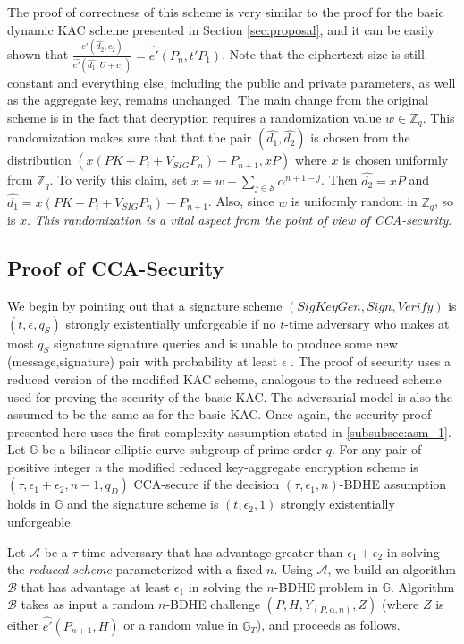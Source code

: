 The proof of correctness of this scheme is very similar to the proof for the basic dynamic KAC scheme presented in Section \ref{sec:proposal}, and it can be easily shown that $\frac{\hat{e'}(\hat{d_2},c_2)}{\hat{e'}(\hat{d_1},U+c_1)}=\hat{e'}(P_n,t'P_1)$. Note that the ciphertext size is still constant and everything else, including the public and private parameters, as well as the aggregate key, remains unchanged. The main change from the original scheme is in the fact that decryption requires a randomization value $w\in\mathbb{Z}_q$. This randomization makes sure that that the pair $(\hat{d_1},\hat{d_2})$ is chosen from the distribution $(x(PK+P_i+V_{SIG}P_n)-P_{n+1},xP)$ where $x$ is chosen uniformly from $\mathbb{Z}_q$. To verify this claim, set $x=w+\sum_{j\in\mathcal{S}}\alpha^{n+1-j}$. Then $\hat{d_2}=xP$ and $\hat{d_1}=x(PK+P_i+V_{SIG}P_n)-P_{n+1}$. Also, since $w$ is uniformly random in $\mathbb{Z}_q$, so is $x$. \emph{This randomization is a vital aspect from the point of view of CCA-security}.

 
\subsection{Proof of CCA-Security}
\label{subsec:proof_cca}

We begin by pointing out that a signature scheme $(SigKeyGen,Sign,Verify)$ is $(t,\epsilon,q_S)$ strongly existentially unforgeable if no $t$-time adversary who makes at most $q_{S}$ signature signature queries and is unable to produce some new (message,signature) pair with probability at least $\epsilon$ \cite{}. The proof of security uses a reduced version of the modified KAC scheme, analogous to the reduced scheme used for proving the security of the basic KAC. The adversarial model is also the assumed to be the same as for the basic KAC. Once again, the security proof presented here uses the first complexity assumption stated in \ref{subsubsec:asm_1}. Let $\mathbb{G}$ be a bilinear elliptic curve subgroup of prime order $q$. For any pair of positive integer $n$ the modified reduced key-aggregate encryption scheme is $(\tau,\epsilon_1+\epsilon_2,n-1,q_D)$ CCA-secure if the decision $(\tau,\epsilon_1,n)$-BDHE assumption holds in $\mathbb{G}$ and the signature scheme is $(t,\epsilon_2,1)$ strongly existentially unforgeable.

\textbf{} Let $\mathcal{A}$ be a $\tau$-time adversary that has advantage greater than $\epsilon_1+\epsilon_2$ in solving the \emph{reduced scheme} parameterized with a fixed $n$. Using $\mathcal{A}$, we build an algorithm $\mathcal{B}$ that has advantage at least $\epsilon_1$ in solving the $n$-BDHE problem in $\mathbb{G}$. Algorithm $\mathcal{B}$ takes as input a random $n$-BDHE challenge $(P,H,Y_{(P,\alpha,n)},Z)$ (where $Z$ is either $\hat{e'}(P_{n+1},H)$ or a random value in $\mathbb{G}_T$), and proceeds as follows.

